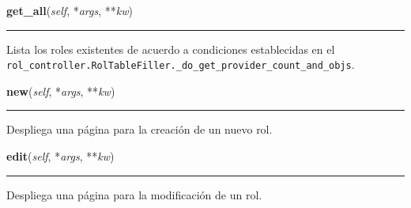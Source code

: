    \vspace{0.5ex}

\hspace{.8\funcindent}\begin{boxedminipage}{\funcwidth}

    \raggedright \textbf{get\_all}(\textit{self}, *\textit{args}, **\textit{kw})

    \vspace{-1.5ex}

    \rule{\textwidth}{0.5\fboxrule}
\setlength{\parskip}{2ex}
    Lista los roles existentes de acuerdo a condiciones establecidas en el 
    \texttt{rol\_controller.RolTableFiller.\_do\_get\_provider\_count\_and\_objs}.

\setlength{\parskip}{1ex}
    \end{boxedminipage}

    \label{saip:controllers:rol_controller:RolController:new}

    \vspace{0.5ex}

\hspace{.8\funcindent}\begin{boxedminipage}{\funcwidth}

    \raggedright \textbf{new}(\textit{self}, *\textit{args}, **\textit{kw})

    \vspace{-1.5ex}

    \rule{\textwidth}{0.5\fboxrule}
\setlength{\parskip}{2ex}
    Despliega una página para la creación de un nuevo rol.

\setlength{\parskip}{1ex}
    \end{boxedminipage}

    \label{saip:controllers:rol_controller:RolController:edit}

    \vspace{0.5ex}

\hspace{.8\funcindent}\begin{boxedminipage}{\funcwidth}

    \raggedright \textbf{edit}(\textit{self}, *\textit{args}, **\textit{kw})

    \vspace{-1.5ex}

    \rule{\textwidth}{0.5\fboxrule}
\setlength{\parskip}{2ex}
    Despliega una página para la modificación de un rol.

\setlength{\parskip}{1ex}
    \end{boxedminipage}

